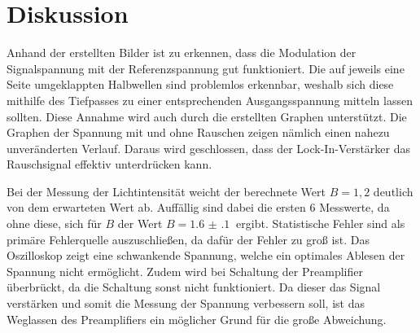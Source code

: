 \section{Diskussion}
\label{sec:Diskussion}



Anhand der erstellten Bilder ist zu erkennen, dass die Modulation der Signalspannung mit der Referenzspannung gut funktioniert.
Die auf jeweils eine Seite umgeklappten Halbwellen sind problemlos erkennbar, weshalb sich diese mithilfe des
Tiefpasses zu einer entsprechenden Ausgangsspannung mitteln lassen sollten. Diese Annahme wird auch durch die erstellten
Graphen unterstützt.
Die Graphen der Spannung mit und ohne Rauschen zeigen nämlich einen nahezu unveränderten Verlauf. Daraus wird geschlossen, dass der
Lock-In-Verstärker das Rauschsignal effektiv unterdrücken kann.

Bei der Messung der Lichtintensität weicht der berechnete Wert $B=1,2$ deutlich von dem erwarteten Wert ab. Auffällig sind dabei
die ersten 6 Messwerte, da ohne diese, sich für $B$ der Wert $B= \SI{1.6(1)}{}$ ergibt. Statistische Fehler sind
als primäre Fehlerquelle auszuschließen, da dafür der Fehler zu groß ist. Das Oszilloskop zeigt eine schwankende Spannung, welche
ein optimales Ablesen der Spannung nicht ermöglicht. Zudem wird bei Schaltung der Preamplifier überbrückt, da die Schaltung sonst nicht
funktioniert. Da dieser das Signal verstärken und somit die Messung der Spannung verbessern soll, ist das Weglassen des
Preamplifiers ein möglicher Grund für die große Abweichung.
